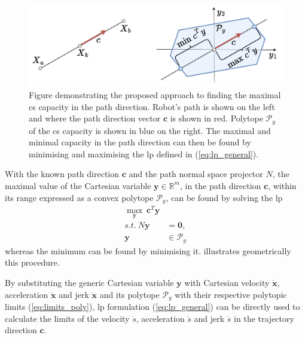 \begin{figure}
    \centering
    \includegraphics[width=0.7\linewidth]{Papers/imgs/dirs.pdf}
    \caption{Figure demonstrating the proposed approach to finding the maximal \gls{cs} capacity in the path direction. Robot's path is shown on the left and where the path direction vector $\bm{c}$ is shown in red. Polytope $\mathcal{P}_y$ of the \gls{cs} capacity is shown in blue on the right. The maximal and minimal capacity in the path direction can then be found by minimising and maximising the \gls{lp} defined in (\ref{eq:lp_general}).}
    \label{fig:normal_lp}
\end{figure}
With the known path direction $\bm{c}$ and the path normal space projector $N$, the maximal value of the Cartesian variable $\bm{y} \in\mathbb{R}^m$, in the path direction $\bm{c}$, within its range expressed as a convex polytope $\mathcal{P}_y$, can be found by solving the \gls{lp} \cite{vajda_gass_1964}
\begin{equation}
\begin{split}
    \max_{\bm{y}} ~\bm{c}^T \bm{y}& \\
    s.t. ~ N\bm{y} &= \bm{0}, \\
    \bm{y}&\in \mathcal{P}_y
\end{split}\label{eq:lp_general}
\end{equation}
whereas the minimum can be found by minimising it.  illustrates geometrically this procedure.

By substituting the generic Cartesian variable $\bm{y}$ with Cartesian velocity $\dot{\bm{x}}$, acceleration $\ddot{\bm{x}}$ and jerk $\dddot{\bm{x}}$ and its polytope $\mathcal{P}_y$  with their respective polytopic limits (\ref{eq:limits_poly}), \gls{lp} formulation (\ref{eq:lp_general}) can be directly used to calculate the limits of the velocity $\dot{s}$, acceleration $\ddot{s}$ and jerk $\dddot{s}$ in the trajectory direction $\bm{c}$.  

